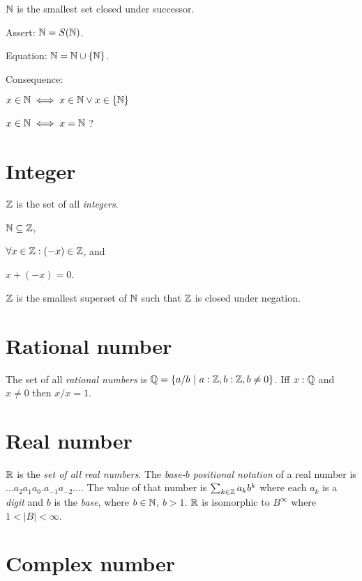 \(\mathbb{N}\) is the smallest set closed under successor.

Assert: \(\mathbb{N} = S(\mathbb{N})\).

Equation:
\(\mathbb{N} = \mathbb{N} \cup \{\mathbb{N}\}\).

Consequence:

\(x \in \mathbb{N} \iff x \in \mathbb{N} \vee x \in \{\mathbb{N}\}\)

\(x \in \mathbb{N} \iff x = \mathbb{N}\)
?

\section{Integer}

%
%
\(\mathbb{Z}\) is the set of all \emph{integers}.
\begin{enumerate*}[label={(\arabic*)}]
    \item \(\mathbb{N} \subseteq \mathbb{Z}\),
    \item \(\forall x \in \mathbb{Z} : (-x) \in \mathbb{Z}\), and
    \item \(x + (-x) = 0\).
\end{enumerate*}

\(\mathbb{Z}\) is the smallest superset of \(\mathbb{N}\)
such that \(\mathbb{Z}\) is closed under negation.

\section{Rational number}

%
%
The set of all \emph{rational numbers} is
\(\mathbb{Q} = \{ a/b ~|~ a : \mathbb{Z}, b : \mathbb{Z}, b \neq 0 \}\).
Iff \(x : \mathbb{Q}\) and \(x \neq 0\) then \(x/x = 1\).

\section{Real number}

%
%
%
%
\(\mathbb{R}\) is the \emph{set of all real numbers}.
The \emph{base-\(b\) positional notation} of a real number
is \(\ldots a_2 a_1 a_0 . a_{-1} a_{-2} \ldots\).
The value of that number is \(\sum_{k \in \mathbb{Z}} a_k b^k\)
where each \(a_k\) is a \emph{digit} and \(b\) is the \emph{base},
where \(b \in \mathbb{N}\), \(b > 1\).
\(\mathbb{R}\) is isomorphic to \(B^\infty\) where \(1 < |B| < \infty\).

\section{Complex number}

